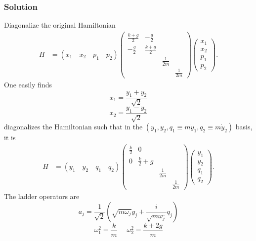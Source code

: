 \subsubsection*{Solution}
Diagonalize the original Hamiltonian 
\begin{align}
H & =(x_{1}\quad x_{2}\quad p_{1}\quad p_{2})\left(\begin{array}{cccc}
\frac{k+g}{2} & -\frac{g}{2}\\
-\frac{g}{2} & \frac{k+g}{2}\\
 &  & \frac{1}{2m}\\
 &  &  & \frac{1}{2m}
\end{array}\right)\left(\begin{array}{c}
x_{1}\\
x_{2}\\
p_{1}\\
p_{2}
\end{array}\right).
\end{align}
One easily finds
\begin{equation}
x_{1}=\frac{y_{1}+y_{2}}{\sqrt{2}}\label{eq:x1}
\end{equation}
\begin{equation}
x_{2}=\frac{y_{1}-y_{2}}{\sqrt{2}}\label{eq:x2}
\end{equation}
diagonalizes the Hamiltonian such that in the $(y_{1},y_{2},q_{1}\equiv m\dot{y}_{1},q_{2}\equiv m\dot{y}_{2})$
basis, it is
\begin{align}
H & =(y_{1}\quad y_{2}\quad q_{1}\quad q_{2})\left(\begin{array}{cccc}
\frac{k}{2} & 0\\
0 & \frac{k}{2}+g\\
 &  & \frac{1}{2m}\\
 &  &  & \frac{1}{2m}
\end{array}\right)\left(\begin{array}{c}
y_{1}\\
y_{2}\\
q_{1}\\
q_{2}
\end{array}\right).
\end{align}
The ladder operators are
\begin{equation}
a_{j}=\frac{1}{\sqrt{2}}\left(\sqrt{m\omega_{j}}y_{j}+\frac{i}{\sqrt{m\omega_{j}}}q_{j}\right)
\end{equation}
\begin{equation}
\omega_{1}^{2}=\frac{k}{m}\,\,\,\,\,\,\,\,\omega_{2}^{2}=\frac{k+2g}{m}
\end{equation}
